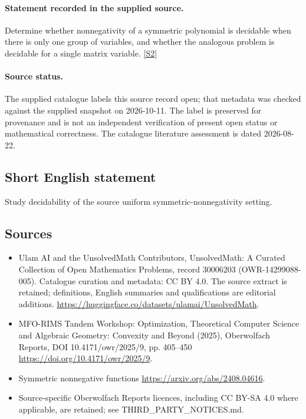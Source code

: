 \documentclass[11pt]{article}
\begin{document}
\paragraph{Statement recorded in the supplied source.}
Determine whether nonnegativity of a symmetric polynomial is decidable when there is only one group of variables, and whether the analogous problem is decidable for a single matrix variable. \href{https://doi.org/10.4171/owr/2025/9}{[S2]}
\paragraph{Source status.}
The supplied catalogue labels this source record open; that metadata was checked against the supplied snapshot on 2026-10-11. The label is preserved for provenance and is not an independent verification of present open status or mathematical correctness. The catalogue literature assessment is dated 2026-08-22.
\subsection{Short English statement}
Study decidability of the source uniform symmetric-nonnegativity setting.
\subsection{Sources}
\begin{itemize}
\item[S1] Ulam AI and the UnsolvedMath Contributors, UnsolvedMath: A Curated Collection of Open Mathematics Problems, record 30006203 (OWR-14299088-005). Catalogue curation and metadata: CC BY 4.0. The source extract is retained; definitions, English summaries and qualifications are editorial additions.
\url{https://huggingface.co/datasets/ulamai/UnsolvedMath}.
\item[S2] MFO-RIMS Tandem Workshop: Optimization, Theoretical Computer Science and Algebraic Geometry: Convexity and Beyond (2025), Oberwolfach Reports, DOI 10.4171/owr/2025/9, pp. 405--450
\url{https://doi.org/10.4171/owr/2025/9}.
\item[S3] Symmetric nonnegative functions
\url{https://arxiv.org/abs/2408.04616}.
\item Source-specific Oberwolfach Reports licences, including CC BY-SA 4.0 where applicable, are retained; see THIRD\_PARTY\_NOTICES.md.
\end{itemize}
\end{document}
